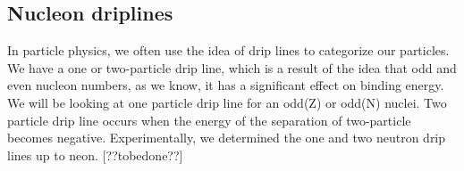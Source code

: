 \subsection{Nucleon driplines}
In particle physics, we often use the idea of drip lines to categorize our particles.
We have a one or two-particle drip line, which is a result of the idea that odd and even nucleon numbers, as we know, it has a significant effect on binding energy.
We will be looking at one particle drip line for an odd(Z) or odd(N) nuclei.
Two particle drip line occurs when the energy of the separation of two-particle becomes negative.
Experimentally, we determined the one and two neutron drip lines up to neon. [??tobedone??]
